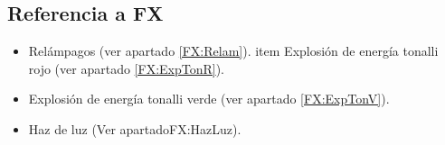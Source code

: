 	\subsection{Referencia a FX}
	\begin{itemize}
		\item Relámpagos (ver apartado \ref{FX:Relam}).
		item Explosión de energía tonalli rojo (ver apartado \ref{FX:ExpTonR}).
	\item Explosión de energía tonalli verde (ver apartado \ref{FX:ExpTonV}).
	\item Haz de luz (Ver apartado{FX:HazLuz}).
	\end{itemize}